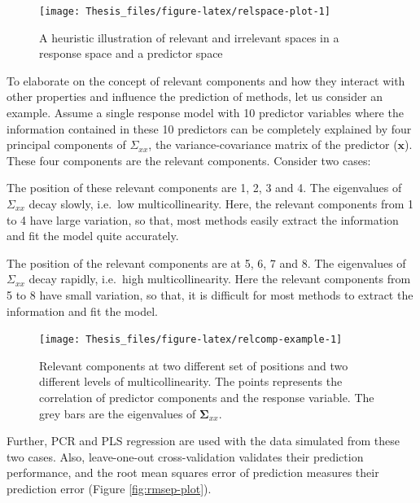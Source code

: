 \documentclass[11pt,twoside,openright,titlepage,
  headinclude,footinclude,BCOR=5mm,
  numbers=noenddot,cleardoublepage=empty,
  tablecaptionabove, dottedtoc,
  bibliography=totoc,paper=a4]{scrreprt}
\providecommand{\tightlist}{%
  \setlength{\itemsep}{0pt}\setlength{\parskip}{0pt}}
\begin{document}
\begin{figure}[!htb]
\texttt{[image: Thesis\_files/figure-latex/relspace-plot-1]} \caption[A heuristic illustration of relevant and irrelevant spaces]{A heuristic illustration of relevant and irrelevant spaces in a response space and a predictor space}\label{fig:relspace-plot}
\end{figure}

To elaborate on the concept of relevant components and how they interact with other properties and influence the prediction of methods, let us consider an example. Assume a single response model with 10 predictor variables where the information contained in these 10 predictors can be completely explained by four principal components of \(\Sigma_{xx}\), the variance-covariance matrix of the predictor (\(\mathbf{x}\)). These four components are the relevant components. Consider two cases:

\begin{description}
\tightlist
\item[Case 1 (Figure \ref{fig:relcomp-example}, left):]
The position of these relevant components are 1, 2, 3 and 4. The eigenvalues of \(\Sigma_{xx}\) decay slowly, i.e.~low multicollinearity. Here, the relevant components from 1 to 4 have large variation, so that, most methods easily extract the information and fit the model quite accurately.
\item[Case 2 (Figure \ref{fig:relcomp-example}, right):]
The position of the relevant components are at 5, 6, 7 and 8. The eigenvalues of \(\Sigma_{xx}\) decay rapidly, i.e.~high multicollinearity. Here the relevant components from 5 to 8 have small variation, so that, it is difficult for most methods to extract the information and fit the model.
\end{description}



\begin{figure}[!htb]
\texttt{[image: Thesis\_files/figure-latex/relcomp-example-1]} \caption[Relevant Components and Multicollinearity]{Relevant components at two different set of positions and two different levels of multicollinearity. The points represents the correlation of predictor components and the response variable. The grey bars are the eigenvalues of \(\boldsymbol{\Sigma}_{xx}\).}\label{fig:relcomp-example}
\end{figure}

Further, PCR and PLS regression are used with the data simulated from these two cases. Also, leave-one-out cross-validation validates their prediction performance, and the root mean squares error of prediction measures their prediction error (Figure \ref{fig:rmsep-plot}).
\end{document}
